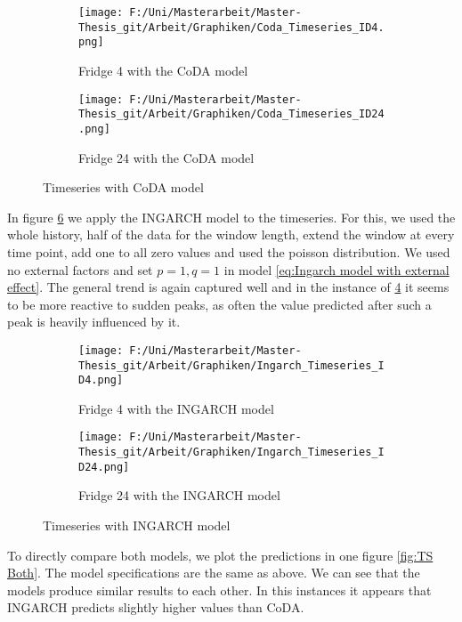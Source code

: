 \begin{figure}[htb]
\centering
\begin{subfigure}[b]{0.45\textwidth}
\texttt{[image: F:/Uni/Masterarbeit/Master-Thesis\_git/Arbeit/Graphiken/Coda\_Timeseries\_ID4.png]}
\caption{Fridge 4 with the CoDA model}
\label{fig:Coda Fridge 4}
\end{subfigure}
\hfill
\begin{subfigure}[b]{0.45\textwidth}
\texttt{[image: F:/Uni/Masterarbeit/Master-Thesis\_git/Arbeit/Graphiken/Coda\_Timeseries\_ID24.png]}
\caption{Fridge 24 with the CoDA model}
\label{fig:Coda Fridge 24}
\end{subfigure}
\caption{Timeseries with CoDA model}
\label{fig:TS Coda}
\end{figure}



In figure \ref{fig:TS Ingarch} we apply the INGARCH model to the timeseries. For this, we used the whole history, half of the data for the window length, extend the window at every time point, add one to all zero values and used the poisson distribution. We used no external factors and set $p=1, q=1$ in model \ref{eq:Ingarch model with external effect}. The general trend is again captured well and in the instance of \ref{fig:Ingarch Fridge 4} it seems to be more reactive to sudden peaks, as often the value predicted after such a peak is heavily influenced by it.

\begin{figure}[htb]
\centering
\begin{subfigure}[b]{0.45\textwidth}
\texttt{[image: F:/Uni/Masterarbeit/Master-Thesis\_git/Arbeit/Graphiken/Ingarch\_Timeseries\_ID4.png]}
\caption{Fridge 4 with the INGARCH model}
\label{fig:Ingarch Fridge 4}
\end{subfigure}
\hfill
\begin{subfigure}[b]{0.45\textwidth}
\texttt{[image: F:/Uni/Masterarbeit/Master-Thesis\_git/Arbeit/Graphiken/Ingarch\_Timeseries\_ID24.png]}
\caption{Fridge 24 with the INGARCH model}
\label{fig:Ingarch Fridge 24}
\end{subfigure}
\caption{Timeseries with INGARCH model}
\label{fig:TS Ingarch}
\end{figure}


To directly compare both models, we plot the predictions in one figure \ref{fig:TS Both}. The model specifications are the same as above. We can see that the models produce similar results to each other. In this instances it appears that INGARCH predicts slightly higher values than CoDA. 

